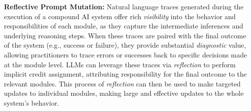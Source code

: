 \noindent \textbf{Reflective Prompt Mutation:}
\label{sec:reflective_prompt_mutation}
Natural language traces generated during the execution of a compound AI system offer rich \textit{visibility} into the behavior and responsibilities of each module, as they capture the intermediate inferences and underlying reasoning steps. When these traces are paired with the final outcome of the system (e.g., success or failure), they provide substantial \textit{diagnostic} value, allowing practitioners to trace errors or successes back to specific decisions made at the module level. LLMs can leverage these traces via \textit{reflection} to perform implicit credit assignment, attributing responsibility for the final outcome to the relevant modules. This process of \textit{reflection} can then be used to make targeted updates to individual modules, making large and effective updates to the whole system's behavior.


